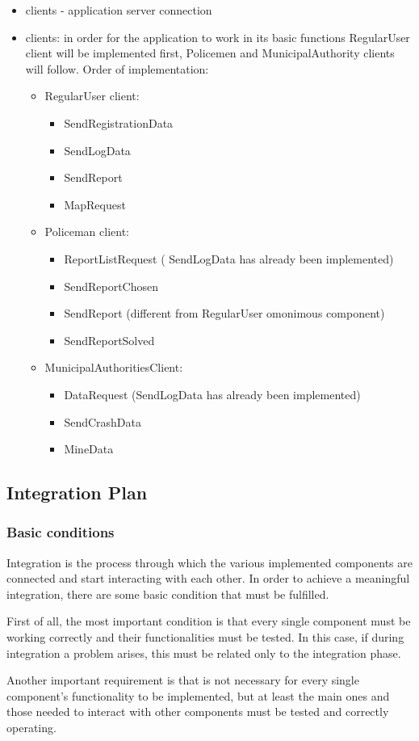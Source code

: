 \begin{itemize}
	\item clients - application server connection
	\item clients: in order for the application to work in its basic functions RegularUser client will be implemented first, Policemen and MunicipalAuthority clients will follow.\newline
	Order of implementation:
		\begin{itemize}
			\item RegularUser client:
			\begin{itemize}
				\item SendRegistrationData
				\item SendLogData
				\item SendReport
				\item MapRequest
			\end{itemize}
			\item Policeman client:
			\begin{itemize}
				\item ReportListRequest ( SendLogData has already been implemented)
				\item SendReportChosen
				\item SendReport (different from RegularUser omonimous component)
				\item SendReportSolved
			\end{itemize}
			\item MunicipalAuthoritiesClient:
				\begin{itemize}
					\item DataRequest (SendLogData has already been implemented)
					\item SendCrashData
					\item MineData
				\end{itemize} 
			\end{itemize}
	\end{itemize} 

\subsection{Integration Plan}
\subsubsection{Basic conditions}
Integration is the process through which the various implemented components are connected and start interacting with each other.
In order to achieve a meaningful integration, there are some basic condition that must be fulfilled. \par
First of all, the most important condition is that every single component must be working correctly and their functionalities must be tested. In this case, if during integration a problem arises, this must be related only to the integration phase. \par
Another important requirement is that is not necessary for every single component's functionality to be implemented, but at least the main ones and those needed to interact with other components must be tested and correctly operating.

